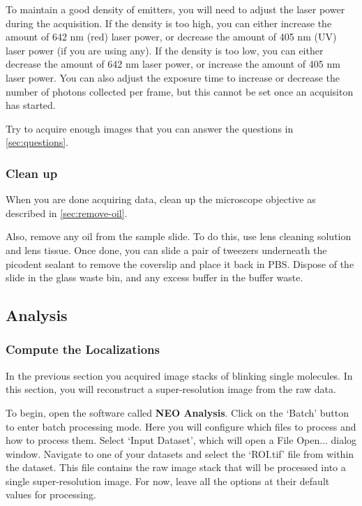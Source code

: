 \documentclass[10pt,a4paper,oneside]{book}
\begin{document}
To maintain a good density of emitters, you will need to adjust the laser power during the acquisition. If the density is too high, you can either increase the amount of 642 nm (red) laser power, or decrease the amount of 405 nm (UV) laser power (if you are using any). If the density is too low, you can either decrease the amount of 642 nm laser power, or increase the amount of 405 nm laser power. You can also adjust the exposure time to increase or decrease the number of photons collected per frame, but this cannot be set once an acquisiton has started.

Try to acquire enough images that you can answer the questions in \autoref{sec:questions}.

\subsubsection{Clean up}

\newline

When you are done acquiring data, clean up the microscope objective as described in \autoref{sec:remove-oil}.

Also, remove any oil from the sample slide. To do this, use lens cleaning solution and lens tissue. Once done, you can slide a pair of tweezers underneath the picodent sealant to remove the coverslip and place it back in PBS. Dispose of the slide in the glass waste bin, and any excess buffer in the buffer waste.

\subsection{Analysis}

\subsubsection{Compute the Localizations}

In the previous section you acquired image stacks of blinking single molecules. In this section, you will reconstruct a super-resolution image from the raw data.

To begin, open the software called \textbf{NEO Analysis}. Click on the `Batch' button to enter batch processing mode. Here you will configure which files to process and how to process them. Select `Input Dataset', which will open a File Open... dialog window. Navigate to one of your datasets and select the `ROI.tif' file from within the dataset. This file contains the raw image stack that will be processed into a single super-resolution image. For now, leave all the options at their default values for processing.
\end{document}
